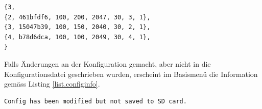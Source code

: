 \begin{lstlisting}[caption=Beispiel einer Konfigurationsdatei, label=list.configfile]
{3,
{2, 461bfdf6, 100, 200, 2047, 30, 3, 1},
{3, 15047b39, 100, 150, 2040, 30, 2, 1},
{4, b78d6dca, 100, 100, 2049, 30, 4, 1},
}
\end{lstlisting}

Falls Änderungen an der Konfiguration gemacht, aber nicht in die Konfigurationsdatei geschrieben wurden, erscheint im Basismenü die Information gemäss Listing \ref{list.configinfo}.

\begin{lstlisting}[caption=Information bei ungespeicherter Konfiguration, label=list.configinfo]
Config has been modified but not saved to SD card.
\end{lstlisting}

